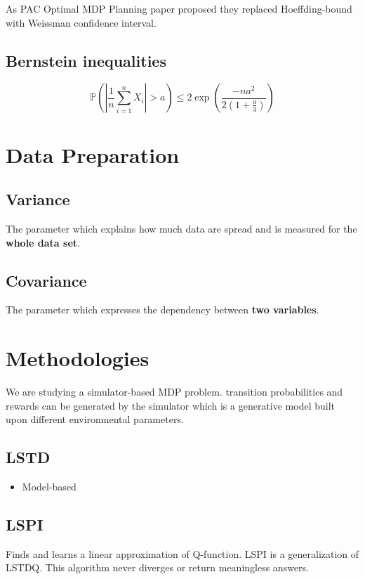 \documentclass[a4paper,12pt]{article}
\begin{document}
As PAC Optimal MDP Planning paper \cite{AlkaeeTaleghan2015a} proposed they replaced Hoeffding-bound with Weissman confidence interval.

\subsection{Bernstein inequalities}
\begin{equation}
    \mathbb { P } \left( \left| \frac { 1 } { n } \sum _ { i = 1 } ^ { n } X _ { i } \right| > a \right) \leq 2 \exp \left( \frac {- n a ^ {2} } { 2 \left( 1 + \frac {a} {3} \right) } \right)
\end{equation}

\section{Data Preparation}

\subsection{Variance}
The parameter which explains how much data are spread and is measured for the \textbf{whole data set}.

\subsection{Covariance}
The parameter which expresses the dependency between \textbf{two variables}.

\section{Methodologies}
We are studying a simulator-based MDP problem. transition probabilities and rewards can be generated by the simulator which is a generative model built upon different environmental parameters.

\subsection{LSTD}
\begin{itemize}
    \item Model-based \cite{Boyan1998}
\end{itemize}

\subsection{LSPI}
Finds and learns a linear approximation of Q-function. LSPI is a generalization of LSTDQ. This algorithm never diverges or return meaningless answers.
\end{document}
